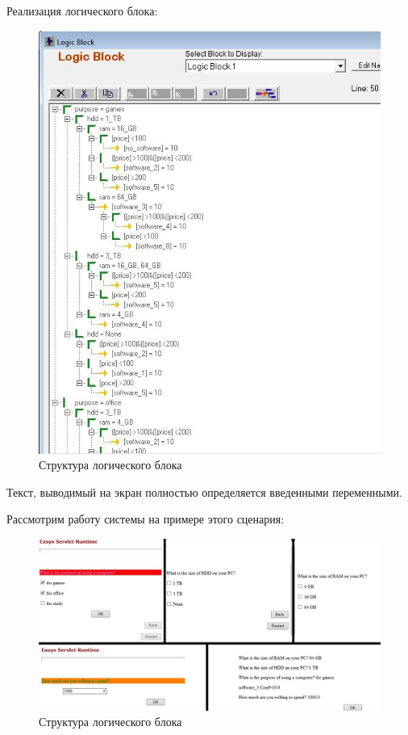 \documentclass[14pt,a4paper,report]{report}
\begin{document}
Реализация логического блока:
\clearpage
\begin{figure}[h!]
	\centering
	\includegraphics[scale = 0.75]{images/1.png}
	\caption{Структура логического блока}
\end{figure}

Текст, выводимый на экран полностью определяется введенными переменными.

Рассмотрим работу системы на примере этого сценария:

\begin{figure}[h!]
	\centering
	\includegraphics[scale = 0.47]{images/2.png}
	\caption{Структура логического блока}
\end{figure}
\end{document}
